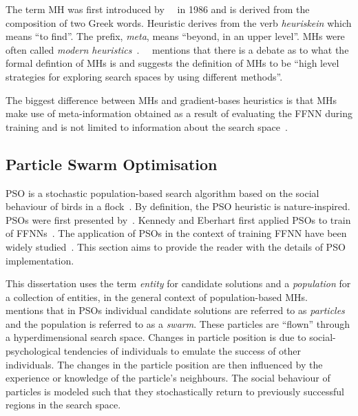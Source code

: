 The term \acf{MH} was first introduced by~\citeauthor{ref:glover:1986}~\cite{ref:glover:1986} in 1986 and is derived from the composition of two Greek words. Heuristic derives from the verb \textit{heuriskein} which means ``to find''. The prefix, \textit{meta}, means ``beyond, in an upper level''. \Acp{MH} were often called \textit{modern heuristics}~\cite{ref:reeves:1993}.~\citeauthor{ref:blum:2003}~\cite{ref:blum:2003} mentions that there is a debate as to what the formal defintion of \acp{MH} is and suggests the definition of \acp{MH} to be ``high level strategies for exploring search spaces by using different methods''.

The biggest difference between \acp{MH} and gradient-bases heuristics is that
\acp{MH} make use of meta-information obtained as a result of evaluating the \acs{FFNN} during training and is not limited to information about the search space~\cite{ref:blum:2003}.


\subsection{Particle Swarm Optimisation}\label{sec:heuristics:mh:pso}

\Acf{PSO} is a stochastic population-based search algorithm based on the social behaviour of birds in a flock~\cite{ref:kennedy:1995}. By definition, the \acs{PSO} heuristic is nature-inspired.  \Acp{PSO} were first presented  by~\citeauthor{ref:kennedy:1995}\cite{ref:kennedy:1995}. Kennedy and Eberhart first applied \acp{PSO} to train of \acp{FFNN}~\cite{ref:eberhart:1995, ref:kennedy:1997}. The application of \acp{PSO} in the context of training \acs{FFNN} have been widely studied~\cite{ref:rakitianskaia:2012, ref:vanwyk:2014}. This section aims to provide the reader with the details of \acs{PSO} implementation.

This dissertation uses the term \textit{entity} for candidate solutions and a \textit{population} for a collection of entities, in the general context of population-based \acp{MH}.~\citeauthor{ref:engelbrecht:2007}~\cite{ref:engelbrecht:2007} mentions that in \acp{PSO} individual candidate solutions are referred to as \textit{particles} and the population is referred to as a \textit{swarm}. These particles are ``flown'' through a hyperdimensional search space. Changes in particle position is due to social-psychological tendencies of individuals to emulate the success of other individuals. The changes in the particle position are then influenced by the experience or knowledge of the particle's neighbours. The social behaviour of particles is modeled such that they stochastically return to previously successful regions in the search space.

